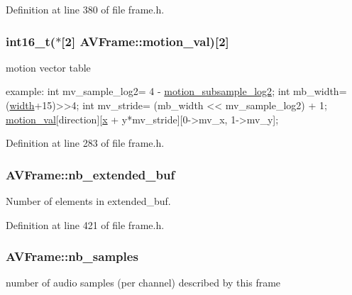Definition at line 380 of file frame.\+h.

\subsubsection[{\texorpdfstring{motion\+\_\+val}{motion_val}}]{ {\bf int16\+\_\+t}($\ast$\mbox{[}2\mbox{]} A\+V\+Frame\+::motion\+\_\+val)\mbox{[}2\mbox{]}}\hypertarget{struct_a_v_frame_addb4424d9ac973ca8b3b7a9a0ecd047a}{}\label{struct_a_v_frame_addb4424d9ac973ca8b3b7a9a0ecd047a}
motion vector table 
\begin{DoxyCode}
example:
\textcolor{keywordtype}{int} mv\_sample\_log2= 4 - \hyperlink{struct_a_v_frame_abfc1b1ee5cf3c8a85650296e1f8a9bca}{motion\_subsample\_log2};
\textcolor{keywordtype}{int} mb\_width= (\hyperlink{struct_a_v_frame_a1e71ce60cedd5f3b6811714a9f7f9e0a}{width}+15)>>4;
\textcolor{keywordtype}{int} mv\_stride= (mb\_width << mv\_sample\_log2) + 1;
\hyperlink{struct_a_v_frame_addb4424d9ac973ca8b3b7a9a0ecd047a}{motion\_val}[direction][\hyperlink{namespacewaflib_1_1_utils_a15fc4f04cecad81fba9772c4e43d40f7}{x} + y*mv\_stride][0->mv\_x, 1->mv\_y];
\end{DoxyCode}
 

Definition at line 283 of file frame.\+h.

\subsubsection[{\texorpdfstring{nb\+\_\+extended\+\_\+buf}{nb_extended_buf}}]{ A\+V\+Frame\+::nb\+\_\+extended\+\_\+buf}\hypertarget{struct_a_v_frame_aa2dc17f4f816018b0782e1386bdbeeb1}{}\label{struct_a_v_frame_aa2dc17f4f816018b0782e1386bdbeeb1}
Number of elements in extended\+\_\+buf. 

Definition at line 421 of file frame.\+h.

\subsubsection[{\texorpdfstring{nb\+\_\+samples}{nb_samples}}]{ A\+V\+Frame\+::nb\+\_\+samples}\hypertarget{struct_a_v_frame_a02f45ab8191aea1660159f1e464237ea}{}\label{struct_a_v_frame_a02f45ab8191aea1660159f1e464237ea}
number of audio samples (per channel) described by this frame 

